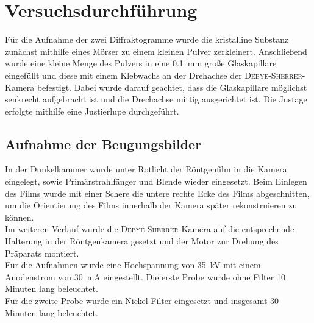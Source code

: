\documentclass[a4paper,twoside,final]{article}
\begin{document}



\section{Versuchsdurchführung} \label{sec:Versuchsdurchführung}
Für die Aufnahme der zwei Diffraktogramme wurde die kristalline Substanz zunächst mithilfe eines Mörser zu einem kleinen Pulver zerkleinert. Anschließend wurde eine kleine Menge des Pulvers in eine \SI{0.1}{\milli\metre} große Glaskapillare eingefüllt und diese mit einem Klebwachs an der Drehachse der \textsc{Debye\--Sherrer}\--Kamera befestigt. Dabei wurde darauf geachtet, dass die Glaskapillare möglichst senkrecht aufgebracht ist und die Drechachse mittig ausgerichtet ist. Die Justage erfolgte mithilfe eine Justierlupe durchgeführt.
\subsection{Aufnahme der Beugungsbilder}
In der Dunkelkammer wurde unter Rotlicht der Röntgenfilm in die Kamera eingelegt, sowie Primärstrahlfänger und Blende wieder eingesetzt. Beim Einlegen des Films wurde mit einer Schere die untere rechte Ecke des Films abgeschnitten, um die Orientierung des Films innerhalb der Kamera später rekonstruieren zu können.\\
Im weiteren Verlauf wurde die \textsc{Debye\--Sherrer}\--Kamera auf die entsprechende Halterung in der Röntgenkamera gesetzt und der Motor zur Drehung des Präparats montiert.\\
Für die Aufnahmen wurde eine Hochspannung von \SI{35}{\kilo\volt} mit einem Anodenstrom von \SI{30}{\milli\ampere} eingestellt. Die erste Probe wurde ohne Filter 10 Minuten lang beleuchtet.\\
Für die zweite Probe wurde ein Nickel-Filter eingesetzt und insgesamt 30 Minuten lang beleuchtet.
\end{document}
